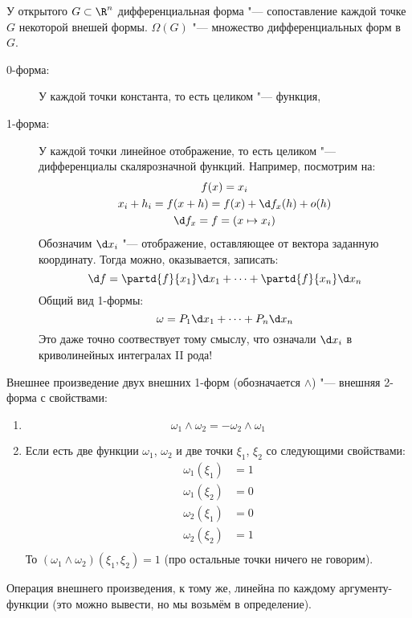 \begin{Def}
	У открытого $G \subset \R^n$ дифференциальная форма "--- сопоставление каждой точке $G$ некоторой внешей формы.
	$\Omega(G)$ "--- множество дифференциальных форм в $G$.
\end{Def}
\begin{exmp}\begin{description}
\item[0-форма:]
	У каждой точки константа, то есть целиком "--- функция,

\item[1-форма:]
	У каждой точки линейное отображение, то есть целиком "--- дифференциалы скалярозначной функций.
	Например, посмотрим на:
	\begin{gather*}
		f(x) = x_i \\
		x_i + h_i = f(x + h) = f(x) + \d f_x(h) + o(h) \\
		\d f_x = f = (x \mapsto x_i)
	\end{gather*}
	Обозначим $\d x_i$ "--- отображение, оставляющее от вектора заданную координату.
	Тогда можно, оказывается, записать:
	\[ \d f = \partd{f}{x_1} \d x_1 + \dots + \partd{f}{x_n} \d x_n \]
	Общий вид 1-формы:
	\[ \omega = P_1 \d x_1 + \dots + P_n \d x_n \]
	Это даже точно соотвествует тому смыслу, что означали $\d x_i$ в криволинейных интегралах II рода!
\end{description}\end{exmp}

\begin{Def}
	Внешнее произведение двух внешних 1-форм (обозначается $\wedge$) "--- внешняя 2-форма с свойствами:
	\begin{enumerate}
	\item
		\[ \omega_1 \wedge \omega_2 = - \omega_2 \wedge \omega_1 \]
	
	\item
		Если есть две функции $\omega_1$, $\omega_2$ и две точки $\xi_1$, $\xi_2$ со следующими свойствами:
		\begin{align*}
			\omega_1(\xi_1) &= 1 \\
			\omega_1(\xi_2) &= 0 \\
			\omega_2(\xi_1) &= 0 \\
			\omega_2(\xi_2) &= 1 \\
		\end{align*}
		То $(\omega_1 \wedge \omega_2)(\xi_1, \xi_2) = 1$ (про остальные точки ничего не говорим).
	\end{enumerate}
	Операция внешнего произведения, к тому же, линейна по каждому аргументу-функции (это можно вывести, но мы возьмём в определение).
\end{Def}

